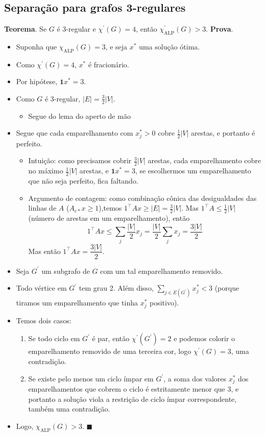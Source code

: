 \documentclass[12pt]{article}
\begin{document}
    \pagebreak
    \subsection*{Separação para grafos 3-regulares}
    {\bf Teorema}. Se $G$ é 3-regular e $\chi^\prime(G) = 4$, então $\chi^\prime_\mathrm{ALP}(G) > 3$.
    {\bf Prova}.

    \begin{itemize}
        \item Suponha que $\chi_\mathrm{ALP}(G) = 3$, e seja $x^*$ uma solução ótima.
        \item Como $\chi^\prime(G) = 4$, $x^*$ é fracionário.
        \item Por hipótese, $\mathbf{1} x^* = 3$.
        \item
            Como $G$ é 3-regular, $|E| = \frac{3}{2}|V|$.
            \begin{itemize}
                \item Segue do lema do aperto de mão
            \end{itemize}
        \item Segue que cada emparelhamento com $x^*_j > 0$ cobre $\frac{1}{2}|V|$ arestas, e portanto é perfeito.
        \begin{itemize}
            \item Intuição: como precisamos cobrir $\frac{3}{2}|V|$ arestas, cada emparelhamento cobre no máximo $\frac{1}{2}|V|$ arestas, e $\mathbf{1} x^* = 3$, se escolhermos um emparelhamento que não seja perfeito, fica faltando.
            \item Argumento de contagem: como combinação cônica das desigualdades das linhas de $A$ ($A_{e*} x \geq 1$),temos $1^\top A x \geq |E| = \frac{3}{2}|V|$. Mas $1^\top A \leq \frac{1}{2}|V|$ (número de arestas em um emparelhamento), então $$1^\top A x \leq \sum_j \dfrac{|V|}{2} x_j = \dfrac{|V|}{2} \sum_j x_j = \dfrac{3|V|}{2}$$
            Mas então $1^\top A x = \dfrac{3|V|}{2}$.
        \end{itemize}
        \item Seja $G^\prime$ um subgrafo de $G$ com um tal emparelhamento removido.
        \item Todo vértice em $G^\prime$ tem grau 2. Além disso, $\sum_{j \in E(G^\prime)} x^*_j < 3$ (porque tiramos um emparelhamento que tinha $x^*_j$ positivo).
        \item Temos dois casos:
        \begin{enumerate}
            \item Se todo ciclo em $G^\prime$ é par, então $\chi^\prime(G^\prime) = 2$ e podemos colorir o emparelhamento removido de uma terceira cor, logo $\chi^\prime(G) = 3$, uma contradição.
            \item Se existe pelo menos um ciclo ímpar em $G^\prime$, a soma dos valores $x^*_j$ dos emparelhamentos que cobrem o ciclo é estritamente menor que 3, e portanto a solução viola a restrição de ciclo ímpar correspondente, também uma contradição.
        \end{enumerate}
        \item Logo, $\chi_\mathrm{ALP}(G) > 3$. $\blacksquare$
    \end{itemize}
\end{document}
